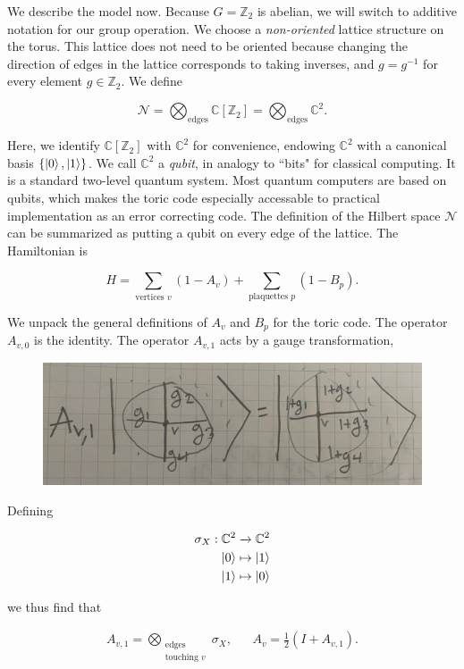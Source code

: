 \documentclass{article}
\theoremstyle{definition}
\newcommand{\ZZ}{\mathbb{Z}}
\newcommand{\CC}{\mathbb{C}}
\newcommand{\NN}{\mathcal{N}}
\newcommand{\0}{\left|0\right>}
\newcommand{\1}{\left|1\right>}
\numberwithin{figure}{section}
\begin{document}
We describe the model now. Because $G=\ZZ_2$ is abelian, we will switch to additive notation for our group operation. We choose a \textit{non-oriented} lattice structure on the torus. This lattice does not need to be oriented because changing the direction of edges in the lattice corresponds to taking inverses, and $g=g^{-1}$ for every element $g\in \ZZ_2$. We define

$$\NN = \bigotimes_{\text{edges}}\CC[\ZZ_2]=\bigotimes_{\text{edges}}\CC^2.$$

Here, we identify $\CC[\ZZ_2]$ with $\CC^2$ for convenience, endowing $\CC^2$ with a canonical basis $\{\ket{0},\ket{1}\}$. We call $\CC^2$ a \textit{qubit}, in analogy to ``bits" for classical computing. It is a standard two-level quantum system. Most quantum computers are based on qubits, which makes the toric code especially accessable to practical implementation as an error correcting code. The definition of the Hilbert space $\NN$ can be summarized as putting a qubit on every edge of the lattice. The Hamiltonian is

$$H=\sum_{\text{vertices }v}(1-A_v)+\sum_{\text{plaquettes }p}(1-B_p).$$

We unpack the general definitions of $A_v$ and $B_p$ for the toric code. The operator $A_{v,0}$ is the identity. The operator $A_{v,1}$ acts by a gauge transformation,

\begin{figure}[h]
\begin{center}
\includegraphics[scale=.04]{Av-gauge-action}
\end{center}
\end{figure}

Defining

\begin{align*}
\sigma_X:\CC^2&\xrightarrow{}\CC^2\\
\ket{0}&\mapsto \ket{1}\\
\ket{1}&\mapsto \ket{0}
\end{align*}

we thus find that

\begin{align*}
A_{v,1}=\bigotimes_{\substack{\text{edges} \\ \text{touching }v}}\sigma_X, && A_v=\frac{1}{2}\left(I + A_{v,1}\right).
\end{align*}
\end{document}
